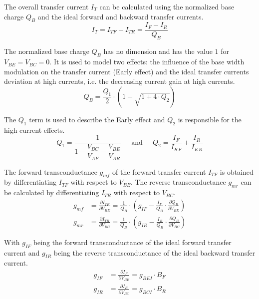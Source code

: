 \documentclass[10pt]{report}
\begin{document}
The overall transfer current $I_T$ can be calculated using the
normalized base charge $Q_B$ and the ideal forward and backward
transfer currents.
\begin{equation}
I_T = I_{TF} - I_{TR} = \dfrac{I_F - I_R}{Q_B}
\end{equation}

The normalized base charge $Q_B$ has no dimension and has the value
$1$ for $V_{BE} = V_{BC} = 0$.  It is used to model two effects: the
influence of the base width modulation on the transfer current (Early
effect) and the ideal transfer currents deviation at high currents,
i.e. the decreasing current gain at high currents.
\begin{equation}
Q_B = \frac{Q_1}{2} \cdot \left(1 + \sqrt{1 + 4\cdot Q_2}\right)
\end{equation}

The $Q_1$ term is used to describe the Early effect and $Q_2$ is
responsible for the high current effects.
\begin{equation}
Q_1 = \frac{1}{1 - \dfrac{V_{BC}}{V_{AF}} - \dfrac{V_{BE}}{V_{AR}}}
\;\;\;\; \text{ and } \;\;\;\;
Q_2 = \frac{I_F}{I_{KF}} + \frac{I_R}{I_{KR}}
\end{equation}

The forward transconductance $g_{mf}$ of the forward transfer current
$I_{TF}$ is obtained by differentiating $I_{TF}$ with respect to
$V_{BE}$.  The reverse transconductance $g_{mr}$ can be calculated by
differentiating $I_{TR}$ with respect to $V_{BC}$.
\begin{align}
\label{eq:SGPgmf}
g_{mf} &= \frac{\partial I_{TF}}{\partial V_{BE}} = \frac{1}{Q_B}\cdot\left(g_{IF} - \frac{I_F}{Q_B}\cdot \frac{\partial Q_B}{\partial V_{BE}}\right)\\
\label{eq:SGPgmr}
g_{mr} &= \frac{\partial I_{TR}}{\partial V_{BC}} = \frac{1}{Q_B}\cdot\left(g_{IR} - \frac{I_R}{Q_B}\cdot \frac{\partial Q_B}{\partial V_{BC}}\right)
\end{align}

With $g_{IF}$ being the forward transconductance of the ideal forward
transfer current and $g_{IR}$ being the reverse transconductance of
the ideal backward transfer current.
\begin{align}
g_{IF} &= \frac{\partial I_F}{\partial V_{BE}} = g_{BEI}\cdot B_F\\
g_{IR} &= \frac{\partial I_R}{\partial V_{BC}} = g_{BCI}\cdot B_R
\end{align}
\end{document}
